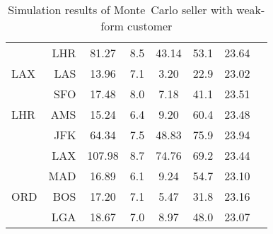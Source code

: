 \begin{table}[h]
\begin{center}
\begin{tabular}{l r c c c c c c}
     &  LHR &  81.27  &    8.5  &  43.14  &   53.1  &  23.64  \\[.5ex]
LAX  &  LAS &  13.96  &    7.1  &   3.20  &   22.9  &  23.02  \\
     &  SFO &  17.48  &    8.0  &   7.18  &   41.1  &  23.51  \\[.5ex]
LHR  &  AMS &  15.24  &    6.4  &   9.20  &   60.4  &  23.48  \\
     &  JFK &  64.34  &    7.5  &  48.83  &   75.9  &  23.94  \\
     &  LAX &  107.98  &    8.7  &  74.76  &   69.2  &  23.44  \\
     &  MAD &  16.89  &    6.1  &   9.24  &   54.7  &  23.10  \\[.5ex]
ORD  &  BOS &  17.20  &    7.1  &   5.47  &   31.8  &  23.16  \\
     &  LGA &  18.67  &    7.0  &   8.97  &   48.0  &  23.07  \\
           \bottomrule
        \end{tabular}
        \caption{Simulation results of Monte~Carlo seller with weak-form customer}
        \label{tbl:resultsMCWeak}
    \end{center}
\end{table}
